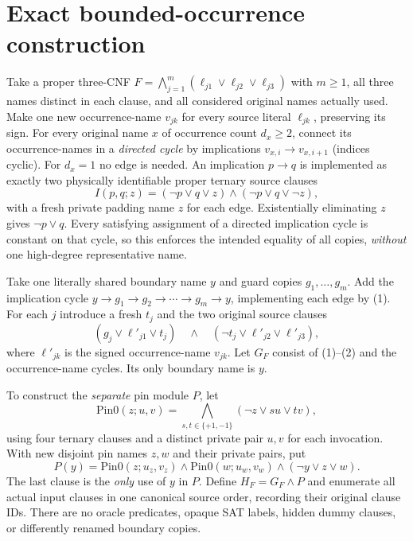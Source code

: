 \documentclass[11pt]{article}
\begin{document}
\section{Exact bounded-occurrence construction}
Take a proper three-CNF $F=\bigwedge_{j=1}^m(\ell_{j1}\vee\ell_{j2}\vee\ell_{j3})$ with $m\ge1$, all three names distinct in each clause, and all considered original names actually used. Make one new occurrence-name $v_{jk}$ for every source literal $\ell_{jk}$, preserving its sign. For every original name $x$ of occurrence count $d_x\ge2$, connect its occurrence-names in a \emph{directed cycle} by implications $v_{x,i}\to v_{x,i+1}$ (indices cyclic). For $d_x=1$ no edge is needed. An implication $p\to q$ is implemented as exactly two physically identifiable proper ternary source clauses
\[
 I(p,q;z)=(\neg p\vee q\vee z)\wedge(\neg p\vee q\vee\neg z),\tag{1}
\]
with a fresh private padding name $z$ for each edge. Existentially eliminating $z$ gives $\neg p\vee q$. Every satisfying assignment of a directed implication cycle is constant on that cycle, so this enforces the intended equality of all copies, \emph{without} one high-degree representative name.

Take one literally shared boundary name $y$ and guard copies $g_1,\ldots,g_m$. Add the implication cycle $y\to g_1\to g_2\to\cdots\to g_m\to y$, implementing each edge by (1). For each $j$ introduce a fresh $t_j$ and the two original source clauses
\[
 (g_j\vee \ell'_{j1}\vee t_j)\quad\wedge\quad
 (\neg t_j\vee\ell'_{j2}\vee\ell'_{j3}),\tag{2}
\]
where $\ell'_{jk}$ is the signed occurrence-name $v_{jk}$. Let $G_F$ consist of (1)--(2) and the occurrence-name cycles. Its only boundary name is $y$.

To construct the \emph{separate} pin module $P$, let
\[
 \mathrm{Pin0}(z;u,v)=\bigwedge_{s,t\in\{+1,-1\}}
 (\neg z\vee s u\vee t v),\tag{3}
\]
using four ternary clauses and a distinct private pair $u,v$ for each invocation. With new disjoint pin names $z,w$ and their private pairs, put
\[
 P(y)=\mathrm{Pin0}(z;u_z,v_z)\wedge
 \mathrm{Pin0}(w;u_w,v_w)\wedge(\neg y\vee z\vee w).\tag{4}
\]
The last clause is the \emph{only} use of $y$ in $P$. Define $H_F=G_F\wedge P$ and enumerate all actual input clauses in one canonical source order, recording their original clause IDs. There are no oracle predicates, opaque SAT labels, hidden dummy clauses, or differently renamed boundary copies.
\end{document}
